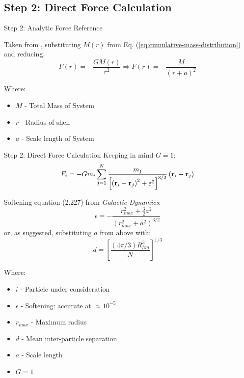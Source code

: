 \subsection{Step 2: Direct Force Calculation}
\begin{frame}{Step 2: Analytic Force Reference}

	Taken from \cite{2008gady}, substituting $M(r)$ from Eq. (\ref{eq:cumulative-mass-distribution}) and
	reducing:
	\begin{equation}
		F(r) = - \frac{GM(r)}{r^2} \Rightarrow F(r) = - \frac{M}{(r+a)^2}
	\end{equation}

	{\footnotesize Where:
	\begin{itemize}
		\item $M$ - Total Mass of System
		\item $r$ - Radius of shell
		\item $a$ - Scale length of System
	\end{itemize}}
\end{frame}

\begin{frame}{Step 2: Direct Force Calculation}
	Keeping in mind $G=1$:
	\begin{equation}
		F_i=-G m_i \sum_{j=1}^N \frac{m_j}{\left[\left(\vb{r}_i-\vb{r}_j\right)^2+\varepsilon^2\right]^{3 /
				2}}\left(\vb{r}_i-\vb{r}_j\right)
	\end{equation}

	Softening equation (2.227) from \textit{Galactic Dynamics}:
	\begin{equation}
		\epsilon=-\frac{r_{max}^2+\frac{3}{2} a^2}{\left(r_{max}^2+a^2\right)^{3 / 2}}
	\end{equation}
	or, as suggested, substituting $a$ from above with:
	\begin{equation}
		d=\left[\frac{(4 \pi / 3) R_{hm}^3}{N}\right]^{1 / 3}
	\end{equation}

	{\footnotesize Where:
	\begin{itemize}
		\item $i$ - Particle under consideration
		\item $\epsilon$ - Softening: accurate at $\approx 10^{-5}$
		\item $r_{max}$ - Maximum radius
		\item $d$ - Mean inter-particle separation
		\item $a$ - Scale length
		\item $G=1$
	\end{itemize}
	}
\end{frame}

